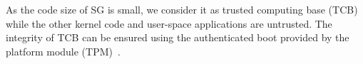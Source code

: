 \documentclass[pageno]{jpaper}
\begin{document}
As the code size of SG is small, we consider it as trusted computing base (TCB) while the other kernel code and user-space applications are untrusted. The integrity of TCB can be ensured using the authenticated boot provided by the platform module (TPM)~\cite{TPM}.
\end{document}
